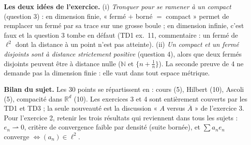 \documentclass[11pt,a4paper]{article}
\newcommand{\R}{\mathbb{R}}
\newcommand{\N}{\mathbb{N}}
\newcommand{\adh}[1]{\overline{#1}}
\theoremstyle{definition}
\begin{document}
\begin{pointcle}
\textbf{Les deux idées de l'exercice.} (i) \emph{Tronquer pour se ramener à un compact} (question 3) : en dimension finie, « fermé $+$ borné $=$ compact » permet de remplacer un fermé par sa trace sur une grosse boule ; en dimension infinie, c'est faux et la question 3 tombe en défaut (TD1 ex.~11, commentaire : un fermé de $\ell^2$ dont la distance à un point n'est pas atteinte). (ii) \emph{Un compact et un fermé disjoints sont à distance strictement positive} (question 4), alors que deux fermés disjoints peuvent être à distance nulle ($\N$ et $\{n+\frac1n\}$). La seconde preuve de 4 ne demande pas la dimension finie : elle vaut dans tout espace métrique.
\end{pointcle}

\begin{commentaire}
\textbf{Bilan du sujet.} Les 30 points se répartissent en : cours (5), Hilbert (10), Ascoli (5), compacité dans $\R^d$ (10). Les exercices 3 et 4 sont entièrement couverts par les TD1 et TD3 ; la seule nouveauté est la discussion « $A$ versus $\adh A$ » de l'exercice 3. Pour l'exercice 2, retenir les trois résultats qui reviennent dans tous les sujets : $e_n\rightharpoonup0$, critère de convergence faible par densité (suite bornée), et $\sum a_ne_n$ converge $\iff(a_n)\in\ell^2$.
\end{commentaire}
\end{document}
